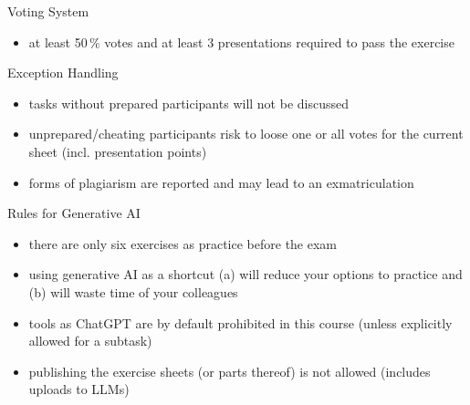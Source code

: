 \begin{frame}{\insertsubsection}
\begin{fancycolumns}[widths={45}]
\begin{definition}{Voting System }
\begin{itemize}
				\item at least 50\,\% votes  and at least 3 presentations  required to pass the exercise 
			\end{itemize}
		\end{definition}
	\end{fancycolumns}
\end{frame}

\begin{frame}{\insertsubsection}
	\begin{fancycolumns}[widths={40}]
		\begin{note}{Exception Handling}
			\begin{itemize}
				\item tasks without prepared participants will not be discussed
				\item unprepared/cheating participants risk to loose one or all votes for the current sheet (incl. presentation points)
				\item forms of plagiarism are reported and may lead to an exmatriculation
			\end{itemize}
		\end{note}
		\nextcolumn
		\begin{note}{Rules for Generative AI}
			\begin{itemize}
				\item there are only six exercises as practice before the exam
				\item using generative AI as a shortcut (a) will reduce your options to practice and (b) will waste time of your colleagues
				\item tools as ChatGPT are by default prohibited in this course (unless explicitly allowed for a subtask)
				\item publishing the exercise sheets (or parts thereof) is not allowed (includes uploads to LLMs)
			\end{itemize}
		\end{note}
	\end{fancycolumns}
\end{frame}

